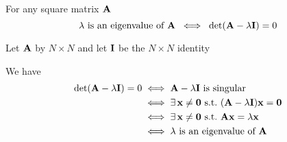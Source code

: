 \begin{frame}
    
    \vspace{2em}
    \Fact{\eqref{ET-fa:chei}} For any square matrix $\mathbf A$ 
    \begin{equation*}
        \lambda \text{ is an eigenvalue of } \mathbf A \; \iff \;
        \det(\mathbf A - \lambda \mathbf I) = 0
    \end{equation*}

    \vspace{1em}

    \Prf  Let $\mathbf A$ by $N \times N$ and let $\mathbf I$ be the $N \times N$
    identity

    We have
    \begin{align*}
        \det(\mathbf A - \lambda \mathbf I) = 0
        & \iff \mathbf A - \lambda \mathbf I \text{ is singular}
        \\
        & \iff \exists \, {\mathbf x} \not= {\mathbf 0} \ \mathrm{s.t.}\ 
            (\mathbf A - \lambda \mathbf I) {\mathbf x} = {\mathbf 0}
        \\
        & \iff \exists \, {\mathbf x} \not= {\mathbf 0} \ \mathrm{s.t.}\ 
        \mathbf A {\mathbf x} = \lambda {\mathbf x}
        \\
        & \iff \lambda 
        \text{ is an eigenvalue of } \mathbf A
    \end{align*}

\end{frame}

